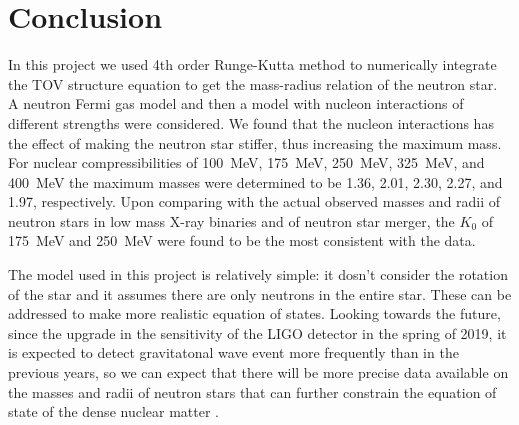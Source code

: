 \documentclass[draft,11pt]{article}
\theoremstyle{definition}
\theoremstyle{remark}
\begin{document}
    \section{Conclusion}
        In this project we used 4th order Runge-Kutta method to numerically integrate the TOV structure equation to get the mass-radius relation of the neutron star. A neutron Fermi gas model and then a model with nucleon interactions of different strengths were considered. We found that the nucleon interactions has the effect of making the neutron star stiffer, thus increasing the maximum mass. For nuclear compressibilities of \SI{100}{\mega\electronvolt}, \SI{175}{\mega\electronvolt}, \SI{250}{\mega\electronvolt}, \SI{325}{\mega\electronvolt}, and \SI{400}{\mega\electronvolt} the maximum masses were determined to be \SI{1.36}{\solarmass}, \SI{2.01}{\solarmass}, \SI{2.30}{\solarmass}, \SI{2.27}{\solarmass}, and \SI{1.97}{\solarmass}, respectively. Upon comparing with the actual observed masses and radii of neutron stars in low mass X-ray binaries and of neutron star merger, the $K_0$ of \SI{175}{\mega\electronvolt} and \SI{250}{\mega\electronvolt} were found to be the most consistent with the data.
        
        The model used in this project is relatively simple: it dosn't consider the rotation of the star and it assumes there are only neutrons in the entire star. These can be addressed to make more realistic equation of states. Looking towards the future, since the upgrade in the sensitivity of the LIGO detector in the spring of 2019, it is expected to detect gravitatonal wave event more frequently than in the previous years, so we can expect that there will be more precise data available on the masses  and radii of neutron stars that can further constrain the equation of state of the dense nuclear matter \cite{ligo.update.2019}.
    
    \printbibliography
\end{document}
